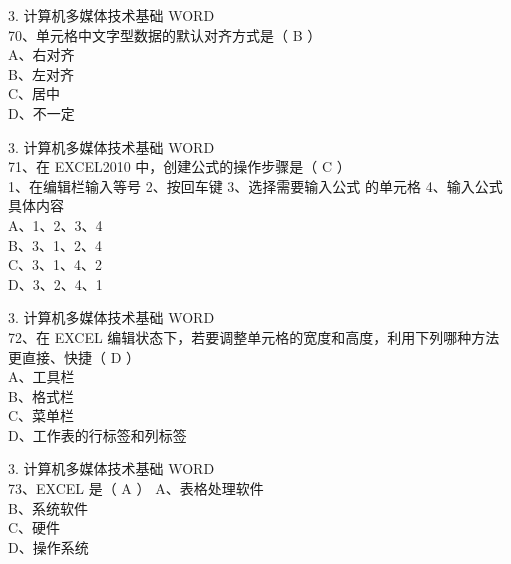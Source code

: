 \documentclass[aspectratio=169]{beamer}
\begin{document}
\begin{frame}[t]{3. 计算机多媒体技术基础} \vspace{20pt}
    WORD\\
70、单元格中文字型数据的默认对齐方式是（ B ）\\
A、右对齐\\ B、左对齐\\ C、居中\\
D、不一定\\
\end{frame}




\begin{frame}[t]{3. 计算机多媒体技术基础} \vspace{20pt}
    WORD\\
71、在 EXCEL2010 中，创建公式的操作步骤是（ C ）\\
1、在编辑栏输入等号 2、按回车键 3、选择需要输入公式
的单元格 4、输入公式具体内容\\

A、1、2、3、4 \\
    B、3、1、2、4 \\
    C、3、1、4、2\\
    D、3、2、4、1\\
\end{frame}



\begin{frame}[t]{3. 计算机多媒体技术基础} \vspace{20pt}
    WORD\\

72、在 EXCEL 编辑状态下，若要调整单元格的宽度和高度，利用下列哪种方法更直接、快捷（ D ）\\
A、工具栏\\ B、格式栏\\ C、菜单栏\\ D、工作表的行标签和列标签\\
\end{frame}


\begin{frame}[t]{3. 计算机多媒体技术基础} \vspace{20pt}
    WORD\\
73、EXCEL 是（ A ）
A、表格处理软件\\ B、系统软件\\ C、硬件\\ D、操作系统\\
\end{frame}
\end{document}
